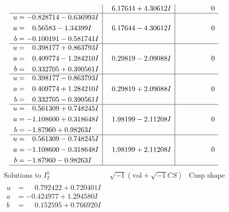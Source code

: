 \documentclass[1p]{elsarticle_modified}
\theoremstyle{definition}
\newcommand{\I}{\sqrt{-1}}
\begin{document}
$$\begin{array}{c|c|c}
 & \phantom{-}6.17644 + 4.30612 I & \phantom{-0.000000 } 0 \\ \hline\begin{aligned}
u &= -0.828714 - 0.636993 I \\
a &= \phantom{-}0.56583 - 1.34399 I \\
b &= -0.100191 - 0.581741 I\end{aligned}
 & \phantom{-}6.17644 - 4.30612 I & \phantom{-0.000000 } 0 \\ \hline\begin{aligned}
u &= \phantom{-}0.398177 + 0.863793 I \\
a &= \phantom{-}0.409774 - 1.284210 I \\
b &= \phantom{-}0.332705 + 0.390561 I\end{aligned}
 & \phantom{-}0.29819 - 2.09088 I & \phantom{-0.000000 } 0 \\ \hline\begin{aligned}
u &= \phantom{-}0.398177 - 0.863793 I \\
a &= \phantom{-}0.409774 + 1.284210 I \\
b &= \phantom{-}0.332705 - 0.390561 I\end{aligned}
 & \phantom{-}0.29819 + 2.09088 I & \phantom{-0.000000 } 0 \\ \hline\begin{aligned}
u &= \phantom{-}0.561309 + 0.748245 I \\
a &= -1.108600 + 0.318648 I \\
b &= -1.87960 + 0.98263 I\end{aligned}
 & \phantom{-}1.98199 - 2.11208 I & \phantom{-0.000000 } 0 \\ \hline\begin{aligned}
u &= \phantom{-}0.561309 - 0.748245 I \\
a &= -1.108600 - 0.318648 I \\
b &= -1.87960 - 0.98263 I\end{aligned}
 & \phantom{-}1.98199 + 2.11208 I & \phantom{-0.000000 } 0\\
 \hline 
 \end{array}$$\newpage$$\begin{array}{c|c|c}  
\text{Solutions to }I^u_{2}& \I (\text{vol} + \sqrt{-1}CS) & \text{Cusp shape}\\
 \hline 
\begin{aligned}
u &= \phantom{-}0.792422 + 0.720401 I \\
a &= -0.424977 + 1.294580 I \\
b &= \phantom{-}0.152595 + 0.766920 I\end{aligned}

\end{array}$$
\end{document}
